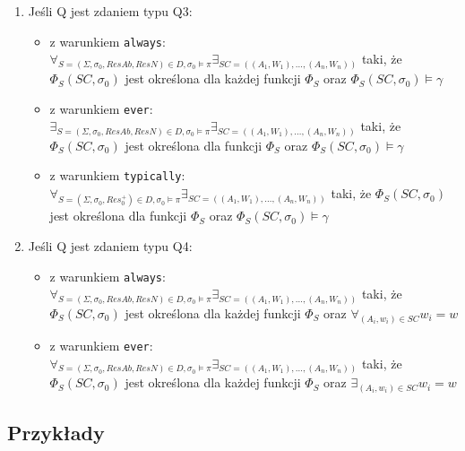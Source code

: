 \documentclass{article}
\begin{document}
\begin{enumerate}
	\item Jeśli Q jest zdaniem typu Q3:
	\begin{itemize}
		\item z warunkiem \texttt{always}: 
		$\forall_{S=(\Sigma, \sigma_{0}, ResAb, ResN) \in D, \sigma_{0} \models \pi} \exists_{SC=((A_{1}, W_{1}), \dots, (A_{n}, W_{n}))}$ taki, że $\Phi_{S}(SC, \sigma_{0})$ jest określona dla każdej funkcji $\Phi_{S}$ oraz $\Phi_{S}(SC, \sigma_{0}) \models \gamma$
		\item z warunkiem \texttt{ever}:
		$\exists_{S=(\Sigma, \sigma_{0}, ResAb, ResN) \in D, \sigma_{0} \models \pi} \exists_{SC=((A_{1}, W_{1}), \dots, (A_{n}, W_{n}))}$ taki, że $\Phi_{S}(SC, \sigma_{0})$ jest określona dla funkcji $\Phi_{S}$ oraz $\Phi_{S}(SC, \sigma_{0}) \models \gamma$
		\item z warunkiem \texttt{typically}:
		$\forall_{S=(\Sigma, \sigma_{0}, Res_{0}^{+}) \in D, \sigma_{0} \models \pi} \exists_{SC=((A_{1}, W_{1}), \dots, (A_{n}, W_{n}))}$ taki, że $\Phi_{S}(SC, \sigma_{0})$ jest określona dla funkcji $\Phi_{S}$ oraz $\Phi_{S}(SC, \sigma_{0}) \models \gamma$
	\end{itemize}
	\item Jeśli Q jest zdaniem typu Q4:
	\begin{itemize}
		\item z warunkiem \texttt{always}: 
		$\forall_{S=(\Sigma, \sigma_{0}, ResAb, ResN) \in D, \sigma_{0} \models \pi} \exists_{SC=((A_{1}, W_{1}), \dots, (A_{n}, W_{n}))}$ taki, że $\Phi_{S}(SC, \sigma_{0})$ jest określona dla każdej funkcji $\Phi_{S}$ oraz $\forall_{(A_{i}, w_{i}) \in SC}w_{i} = w$
		\item z warunkiem \texttt{ever}:
		$\forall_{S=(\Sigma, \sigma_{0}, ResAb, ResN) \in D, \sigma_{0} \models \pi} \exists_{SC=((A_{1}, W_{1}), \dots, (A_{n}, W_{n}))}$ taki, że $\Phi_{S}(SC, \sigma_{0})$ jest określona dla każdej funkcji $\Phi_{S}$ oraz $\exists_{(A_{i}, w_{i}) \in SC}w_{i} = w$
	\end{itemize}
\end{enumerate} 


\subsection{Przykłady}
\end{document}
